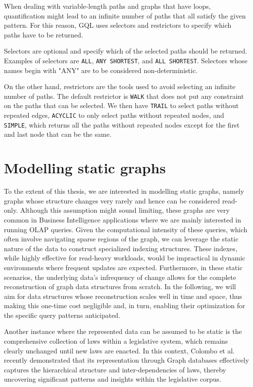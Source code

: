 When dealing with variable-length paths and graphs that have loops, quantification might lead to an infinite number of paths that all satisfy the given pattern. For this reason, GQL uses selectors and restrictors to specify which paths have to be returned.

Selectors are optional and specify which of the selected paths should be returned. Examples of selectors are \verb|ALL|, \verb|ANY SHORTEST|, and \verb|ALL SHORTEST|. Selectors whose names begin with "ANY" are to be considered non-deterministic.

On the other hand, restrictors are the tools used to avoid selecting an infinite number of paths. The default restrictor is \verb|WALK| that does not put any constraint on the paths that can be selected. We then have \verb|TRAIL| to select paths without repeated edges, \verb|ACYCLIC|  to only select paths without repeated nodes, and \verb | SIMPLE|, which returns all the paths without repeated nodes except for the first and last node that can be the same.




\section{Modelling static graphs}

To the extent of this thesis, we are interested in modelling static graphs, namely graphs whose structure changes very rarely and hence can be considered read-only. Although this assumption might sound limiting, these graphs are very common in Business Intelligence applications where we are mainly interested in running OLAP queries. Given the computational intensity of these queries, which often involve navigating sparse regions of the graph, we can leverage the static nature of the data to construct specialized indexing structures. These indexes, while highly effective for read-heavy workloads, would be impractical in dynamic environments where frequent updates are expected. Furthermore, in these static scenarios, the underlying data's infrequency of change allows for the complete reconstruction of graph data structures from scratch. In the following, we will aim for data structures whose reconstruction scales well in time and space, thus making this one-time cost negligible and, in turn, enabling their optimization for the specific query patterns anticipated.

Another instance where the represented data can be assumed to be static is the comprehensive collection of laws within a legislative system, which remains clearly unchanged until new laws are enacted. In this context, Colombo et al. \cite{colombo} recently demonstrated that its representation through Graph databases effectively captures the hierarchical structure and inter-dependencies of laws, thereby uncovering significant patterns and insights within the legislative corpus.

